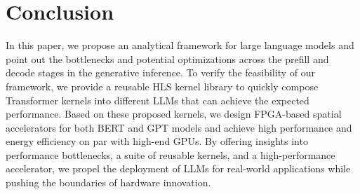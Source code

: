 \section{Conclusion}
\label{sec:conclusion}
In this paper, we propose an analytical framework for large language models and point out the bottlenecks and potential optimizations across the prefill and decode stages in the generative inference.
To verify the feasibility of our framework, we provide a reusable HLS kernel library to quickly compose Transformer kernels into different LLMs that can achieve the expected performance.
Based on these proposed kernels, we design FPGA-based spatial accelerators for both BERT and GPT models and achieve high performance and energy efficiency on par with high-end GPUs.
By offering insights into performance bottlenecks, a suite of reusable kernels, and a high-performance accelerator, we propel the deployment of LLMs for real-world applications while pushing the boundaries of hardware innovation.

